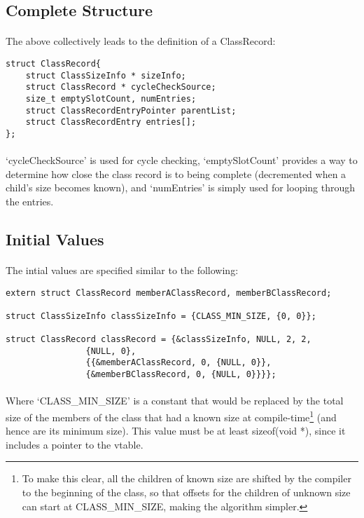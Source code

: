 \documentclass{article}
\begin{document}
\subsection{Complete Structure}

\paragraph{}
The above collectively leads to the definition of a ClassRecord:

\begin{lstlisting}
struct ClassRecord{
	struct ClassSizeInfo * sizeInfo;
	struct ClassRecord * cycleCheckSource;
	size_t emptySlotCount, numEntries;
	struct ClassRecordEntryPointer parentList;
	struct ClassRecordEntry entries[];
};
\end{lstlisting}

\paragraph{}
`cycleCheckSource' is used for cycle checking, `emptySlotCount' provides a way to determine how close the class record is to being complete (decremented when a child's size becomes known), and `numEntries' is simply used for looping through the entries.

\subsection{Initial Values}

\paragraph{}
The intial values are specified similar to the following:

\begin{lstlisting}
extern struct ClassRecord memberAClassRecord, memberBClassRecord;

struct ClassSizeInfo classSizeInfo = {CLASS_MIN_SIZE, {0, 0}};

struct ClassRecord classRecord = {&classSizeInfo, NULL, 2, 2,
				{NULL, 0},
				{{&memberAClassRecord, 0, {NULL, 0}},
				{&memberBClassRecord, 0, {NULL, 0}}}};
\end{lstlisting}

\paragraph{}
Where `CLASS\_MIN\_SIZE' is a constant that would be replaced by the total size of the members of the class that had a known size at compile-time\footnote{To make this clear, all the children of known size are shifted by the compiler to the beginning of the class, so that offsets for the children of unknown size can start at CLASS\_MIN\_SIZE, making the algorithm simpler.} (and hence are its minimum size). This value must be at least sizeof(void *), since it includes a pointer to the vtable.
\end{document}
